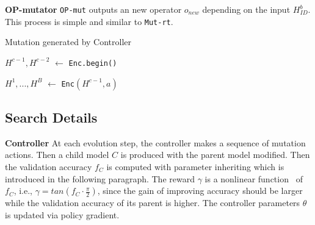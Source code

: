 \documentclass[10pt,twocolumn,letterpaper]{article}
\begin{document}
\noindent
\textbf{OP-mutator}\quad
\texttt{OP-mut} outputs an new operator $o_{new}$ depending on the input $H_{ID}^b$. This process is simple and similar to \texttt{Mut-rt}.

\begin{algorithm}[t]
\caption{Mutation generated by Controller} \label{algo:2}

\begin{small}

$H^{c-1},H^{c-2}$ $\gets$ \texttt{Enc.begin()}

$H^1,...,H^B$  $\gets$ \texttt{Enc}$(H^{c-1},a)$

\end{small}
\end{algorithm}


\subsection{Search Details}
\label{4.3}

\noindent
\textbf{Controller}\quad
At each evolution step, the controller makes a sequence of mutation actions. Then a child model $C$ is produced with the parent model modified. Then the validation accuracy $f_C$ is computed with parameter inheriting which is introduced in the following paragraph.
The reward $\gamma$ is a nonlinear function~\cite{cai2018efficient} of $f_C$, i.e., $\gamma=tan(f_C \cdot \frac{\pi}{2})$, since the gain of improving accuracy should be larger while the validation accuracy of its parent is higher.
The controller parameters $\theta$ is updated via policy gradient.
\end{document}
